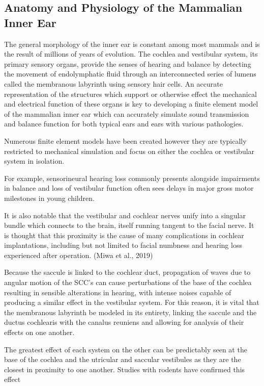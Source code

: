 \documentclass[12pt]{article}
\begin{document}
\subsection{Anatomy and Physiology of the Mammalian Inner Ear}
The general morphology of the inner ear is constant among most mammals and is the result of millions of years of evolution. \cite{ekdale:chinchanat} The cochlea and vestibular system, its primary sensory organs, provide the senses of hearing and balance by detecting the movement of endolymphatic fluid through an interconnected series of lumens called the membranous labyrinth using sensory hair cells. An accurate representation of the structures which support or otherwise effect the mechanical and electrical function of these organs is key to developing a finite element model of the mammalian inner ear which can accurately simulate sound transmission and balance function for both typical ears and ears with various pathologies. 
	    
   Numerous finite element models have been created however they are typically restricted to mechanical simulation and focus on either the cochlea or vestibular system in isolation.
   
    For example, sensorineural hearing loss commonly presents alongside impairments in balance and loss of vestibular function often sees delays in major gross motor milestones in young children. \cite{cushing}
   
   It is also notable that the vestibular and cochlear nerves unify into a singular bundle which connects to the brain, itself running tangent to the facial nerve. It is thought that this proximity is the cause of many complications in cochlear implantations, including but not limited to facial numbness and hearing loss experienced after operation. (Miwa et al., 2019)
   
   Because the saccule is linked to the cochlear duct, propagation of waves due to angular motion of the SCC’s can cause perturbations of the base of the cochlea resulting in sensible alterations in hearing, with intense noises capable of producing a similar effect in the vestibular system. For this reason, it is vital that the membranous labyrinth be modeled in its entirety, linking the saccule and the ductus cochlearis with the canalus reuniens and allowing for analysis of their effects on one another.
   
   The greatest effect of each system on the other can be predictably seen at the base of the cochlea and the utricular and saccular vestibules as they are the closest in proximity to one another.  Studies with rodents have confirmed this effect \cite{mizrachi}
   
\end{document}

